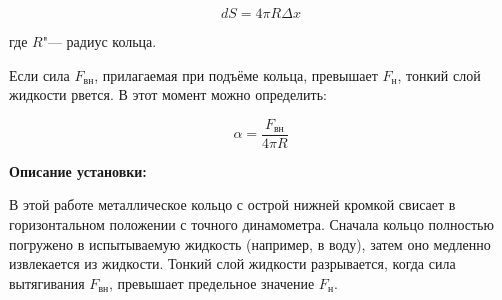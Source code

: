\begin{equation*}
    d S = 4 \pi R \Delta x
\end{equation*}

где \texttt{$R$}"--- радиус кольца. 

Если сила \texttt{$F_\text{вн}$}, прилагаемая при подъёме кольца, превышает \texttt{$F_\text{н}$}, тонкий слой жидкости рвется. В этот момент можно определить:

\begin{equation}
    \alpha = \frac{F_\text{вн}}{4 \pi R}
\end{equation}

\vspace{0.5cm}

\textbf{Описание установки:}

В этой работе металлическое кольцо с острой нижней кромкой свисает в горизонтальном положении с точного динамометра. Сначала кольцо полностью погружено в испытываемую жидкость (например, в воду), затем оно медленно извлекается из жидкости. Тонкий слой жидкости разрывается, когда сила вытягивания \texttt{$F_\text{вн}$}, превышает предельное значение \texttt{$F_\text{н}$}.

\vspace{0.5cm}

